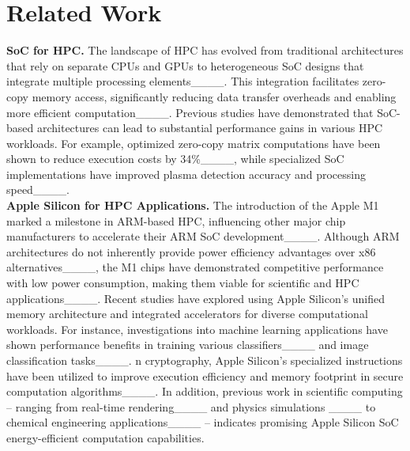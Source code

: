 \section{Related Work}
\noindent  \textbf{SoC for HPC.} The landscape of HPC has evolved from traditional architectures that rely on separate CPUs and GPUs to heterogeneous SoC designs that integrate multiple processing elements____.  This integration facilitates zero-copy memory access, significantly reducing data transfer overheads and enabling more efficient computation____. Previous studies have demonstrated that SoC-based architectures can lead to substantial performance gains in various HPC workloads. For example, optimized zero-copy matrix computations have been shown to reduce execution costs by 34\%____, while specialized SoC implementations have improved plasma detection accuracy and processing speed____. \\

\noindent  \textbf{Apple Silicon for HPC Applications.} The introduction of the Apple M1 marked a milestone in ARM-based HPC, influencing other major chip manufacturers to accelerate their ARM SoC development____. Although ARM architectures do not inherently provide power efficiency advantages over x86 alternatives____, the M1 chips have demonstrated competitive performance with low power consumption, making them viable for scientific and HPC applications____. Recent studies have explored using Apple Silicon’s unified memory architecture and integrated accelerators for diverse computational workloads. For instance, investigations into machine learning applications have shown performance benefits in training various classifiers____ and image classification tasks____. n cryptography, Apple Silicon’s specialized instructions have been utilized to improve execution efficiency and memory footprint in secure computation algorithms____.  In addition, previous work in scientific computing -- ranging from real-time rendering____ and physics simulations ____ to chemical engineering applications____ -- indicates promising Apple Silicon SoC energy-efficient computation capabilities.